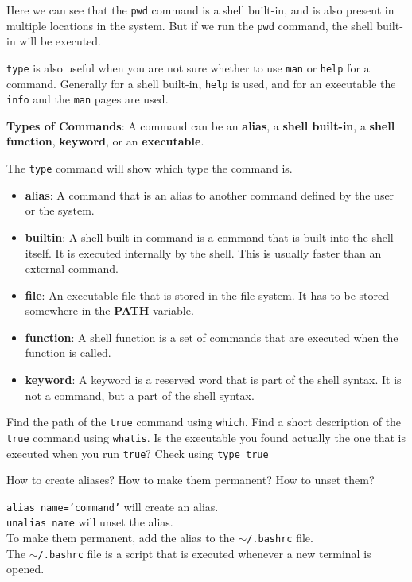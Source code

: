 Here we can see that the \texttt{pwd} command is a shell built-in, and is also present in multiple locations in the system.
But if we run the \texttt{pwd} command, the shell built-in will be executed.

\texttt{type} is also useful when you are not sure whether to use \texttt{man} or \texttt{help} for a command.
Generally for a shell built-in, \texttt{help} is used, and for an executable
the \texttt{info} and the \texttt{man} pages are used.


\textbf{Types of Commands}:
A command can be an \textbf{alias}, a \textbf{shell built-in},
a \textbf{shell function}, \textbf{keyword},
or an \textbf{executable}.

The \texttt{type} command will show which type the command is.
\begin{itemize}
  \item \textbf{alias}: A command that is an alias to another command defined
    by the user or the system.
  \item \textbf{builtin}: A shell built-in command is a command that is built
    into the shell itself. It is executed internally by the shell.
    This is usually faster than an external command.
  \item \textbf{file}: An executable file that is stored in the file system.
    It has to be stored somewhere in the \textbf{PATH} variable.
  \item \textbf{function}: A shell function is a set of commands that are
    executed when the function is called.
  \item \textbf{keyword}: A keyword is a reserved word that is part of the shell
    syntax. It is not a command, but a part of the shell syntax.
\end{itemize}

\begin{exercise}
  Find the path of the \texttt{true} command using \texttt{which}.
  Find a short description of the \texttt{true} command using \texttt{whatis}.
  Is the executable you found actually the one that is executed when you run \texttt{true}? Check using \texttt{type true}
\end{exercise}



\begin{qs}
  How to create aliases? How to make them permanent? How to unset them?
\end{qs}

\begin{ans}
  \texttt{alias name='command'} will create an alias. \\
  \texttt{unalias name} will unset the alias. \\
  To make them permanent, add the alias to the \texttt{$\sim$/.bashrc} file. \\
  The \texttt{$\sim$/.bashrc} file is a script that is executed whenever a new terminal is opened.
\end{ans}

